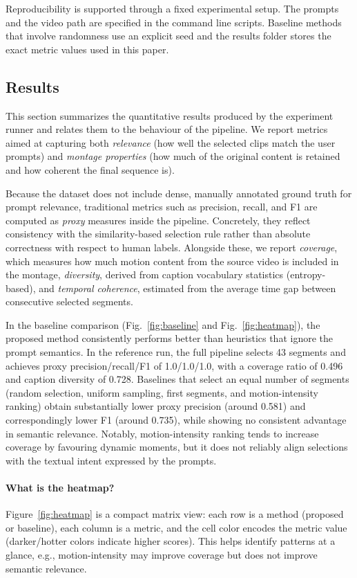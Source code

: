 \documentclass[conference,compsoc]{IEEEtran}
\begin{document}
Reproducibility is supported through a fixed experimental setup. The prompts and the video path are specified in the command line scripts. Baseline methods that involve randomness use an explicit seed and the results folder stores the exact metric values used in this paper.

\subsection{Results}
This section summarizes the quantitative results produced by the experiment runner and relates them to the behaviour of the pipeline. We report metrics aimed at capturing both \emph{relevance} (how well the selected clips match the user prompts) and \emph{montage properties} (how much of the original content is retained and how coherent the final sequence is).

Because the dataset does not include dense, manually annotated ground truth for prompt relevance, traditional metrics such as precision, recall, and F1 are computed as \emph{proxy} measures inside the pipeline. Concretely, they reflect consistency with the similarity-based selection rule rather than absolute correctness with respect to human labels. Alongside these, we report \emph{coverage}, which measures how much motion content from the source video is included in the montage, \emph{diversity}, derived from caption vocabulary statistics (entropy-based), and \emph{temporal coherence}, estimated from the average time gap between consecutive selected segments.

In the baseline comparison (Fig.~\ref{fig:baseline} and Fig.~\ref{fig:heatmap}), the proposed method consistently performs better than heuristics that ignore the prompt semantics. In the reference run, the full pipeline selects 43 segments and achieves proxy precision/recall/F1 of 1.0/1.0/1.0, with a coverage ratio of 0.496 and caption diversity of 0.728. Baselines that select an equal number of segments (random selection, uniform sampling, first segments, and motion-intensity ranking) obtain substantially lower proxy precision (around 0.581) and correspondingly lower F1 (around 0.735), while showing no consistent advantage in semantic relevance. Notably, motion-intensity ranking tends to increase coverage by favouring dynamic moments, but it does not reliably align selections with the textual intent expressed by the prompts.

\paragraph{What is the heatmap?}
Figure~\ref{fig:heatmap} is a compact matrix view: each row is a method (proposed or baseline), each column is a metric, and the cell color encodes the metric value (darker/hotter colors indicate higher scores). This helps identify patterns at a glance, e.g., motion-intensity may improve coverage but does not improve semantic relevance.
\end{document}

